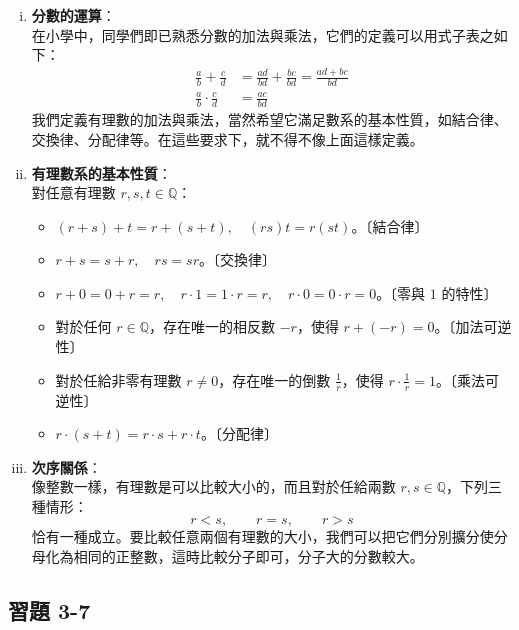 \begin{enumerate}[(i)]
  有理數的另一種表示法便是「小數」。任何一個有理數皆可化為小數（有限小數或循環小數）；反之，任一有限小數或循環小數，皆可化為一有理數。

  \item \textbf{分數的運算}：\\
  在小學中，同學們即已熟悉分數的加法與乘法，它們的定義可以用式子表之如下：
  \begin{align}
    \frac{a}{b} + \frac{c}{d} &= \frac{ad}{bd} + \frac{bc}{bd} = \frac{ad + bc}{bd} \label{eq:frac_add} \\
    \frac{a}{b} \cdot \frac{c}{d} &= \frac{ac}{bd} \label{eq:frac_mul}
  \end{align}
  我們定義有理數的加法與乘法，當然希望它滿足數系的基本性質，如結合律、交換律、分配律等。在這些要求下，就不得不像上面這樣定義。

  \item \textbf{有理數系的基本性質}：\\
  對任意有理數 $r, s, t \in \mathbb{Q}$：
  \begin{itemize}
    \item $(r+s)+t = r+(s+t), \quad (rs)t = r(st)$。〔結合律〕
    \item $r+s = s+r, \quad rs = sr$。〔交換律〕
    \item $r+0 = 0+r = r, \quad r \cdot 1 = 1 \cdot r = r, \quad r \cdot 0 = 0 \cdot r = 0$。〔零與 $1$ 的特性〕
    \item 對於任何 $r \in \mathbb{Q}$，存在唯一的相反數 $-r$，使得 $r + (-r) = 0$。〔加法可逆性〕
    \item 對於任給非零有理數 $r \neq 0$，存在唯一的倒數 $\frac{1}{r}$，使得 $r \cdot \frac{1}{r} = 1$。〔乘法可逆性〕
    \item $r \cdot (s+t) = r \cdot s + r \cdot t$。〔分配律〕
  \end{itemize}

  \item \textbf{次序關係}：\\
  像整數一樣，有理數是可以比較大小的，而且對於任給兩數 $r, s \in \mathbb{Q}$，下列三種情形：
  \begin{equation*}
    r < s, \qquad r = s, \qquad r > s
  \end{equation*}
  恰有一種成立。要比較任意兩個有理數的大小，我們可以把它們分別擴分使分母化為相同的正整數，這時比較分子即可，分子大的分數較大。
\end{enumerate}

\subsection*{習題 3-7}\label{sec:ex3-7}


